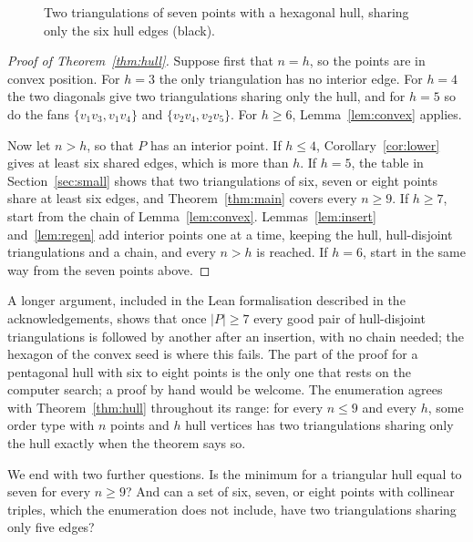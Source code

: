 \documentclass[11pt]{amsart}
\theoremstyle{definition}
\begin{document}
\begin{figure}[t]
\centering
\caption{Two triangulations of seven points with a hexagonal hull, sharing only the six hull edges (black).}\label{fig:seven}
\end{figure}

\begin{proof}[Proof of Theorem~\ref{thm:hull}]
Suppose first that $n=h$, so the points are in convex position. For $h=3$ the only triangulation has no interior edge. For $h=4$ the two diagonals give two triangulations sharing only the hull, and for $h=5$ so do the fans $\{v_1v_3,v_1v_4\}$ and $\{v_2v_4,v_2v_5\}$. For $h\geq6$, Lemma~\ref{lem:convex} applies.

Now let $n>h$, so that $P$ has an interior point. If $h\leq4$, Corollary~\ref{cor:lower} gives at least six shared edges, which is more than $h$. If $h=5$, the table in Section~\ref{sec:small} shows that two triangulations of six, seven or eight points share at least six edges, and Theorem~\ref{thm:main} covers every $n\geq9$. If $h\geq7$, start from the chain of Lemma~\ref{lem:convex}. Lemmas~\ref{lem:insert} and~\ref{lem:regen} add interior points one at a time, keeping the hull, hull-disjoint triangulations and a chain, and every $n>h$ is reached. If $h=6$, start in the same way from the seven points above.
\end{proof}

A longer argument, included in the Lean formalisation described in the acknowledgements, shows that once $|P|\geq7$ every good pair of hull-disjoint triangulations is followed by another after an insertion, with no chain needed; the hexagon of the convex seed is where this fails. The part of the proof for a pentagonal hull with six to eight points is the only one that rests on the computer search; a proof by hand would be welcome. The enumeration agrees with Theorem~\ref{thm:hull} throughout its range: for every $n\leq9$ and every $h$, some order type with $n$ points and $h$ hull vertices has two triangulations sharing only the hull exactly when the theorem says so.

We end with two further questions. Is the minimum for a triangular hull equal to seven for every $n\geq9$? And can a set of six, seven, or eight points with collinear triples, which the enumeration does not include, have two triangulations sharing only five edges?
\end{document}

